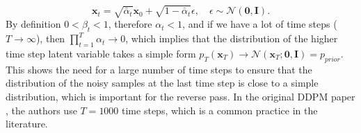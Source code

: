 \begin{equation}\label{eq:forward_sample2}
    \mathbf{x}_t = \sqrt{\bar\alpha_t} \mathbf{x}_0 + \sqrt{1-\bar{\alpha}_t} \epsilon, \quad \epsilon \sim \mathcal{N}(\mathbf{0}, \mathbf{I}).
\end{equation}
By definition $0 < \beta_t < 1$, therefore $\alpha_t < 1$, and if we have a lot of time steps ($T \rightarrow \infty$), then $\prod_{t=1}^T \alpha_t \rightarrow 0$, which implies 
that the distribution of the higher time step latent variable takes a simple form $p_T(\mathbf{x}_T) \rightarrow \mathcal{N}(\mathbf{x}_T; \mathbf{0}, \mathbf{I}) = p_{prior}$. 
This shows the need for a large number of time steps to ensure that the distribution of the noisy samples at the last time step is close to a simple distribution, which is important 
for the reverse pass. In the original DDPM paper \cite{ho2020denoisingdiffusionprobabilisticmodels}, the authors use $T=1000$ time steps, which is a common practice in the literature. 

